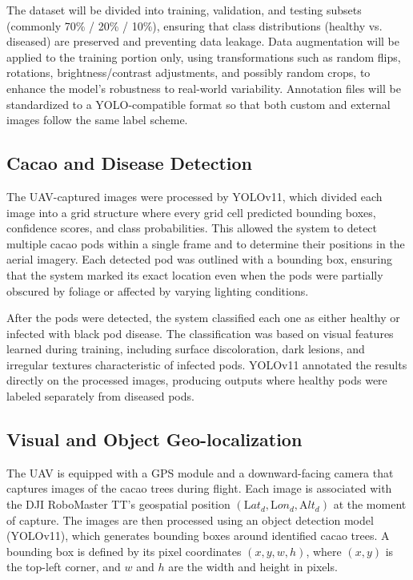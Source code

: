 The dataset will be divided into training, validation, and testing subsets (commonly 70\% / 20\% / 10\%), ensuring that class distributions (healthy vs. diseased) are preserved and preventing data leakage. Data augmentation will be applied to the training portion only, using transformations such as random flips, rotations, brightness/contrast adjustments, and possibly random crops, to enhance the model’s robustness to real-world variability. Annotation files will be standardized to a YOLO-compatible format so that both custom and external images follow the same label scheme.

\subsection{Cacao and Disease Detection}

The UAV-captured images were processed by YOLOv11, which divided each image into a grid structure where every grid cell predicted bounding boxes, confidence scores, and class probabilities. This allowed the system to detect multiple cacao pods within a single frame and to determine their positions in the aerial imagery. Each detected pod was outlined with a bounding box, ensuring that the system marked its exact location even when the pods were partially obscured by foliage or affected by varying lighting conditions.

After the pods were detected, the system classified each one as either healthy or infected with black pod disease. The classification was based on visual features learned during training, including surface discoloration, dark lesions, and irregular textures characteristic of infected pods. YOLOv11 annotated the results directly on the processed images, producing outputs where healthy pods were labeled separately from diseased pods.

\subsection{Visual and Object Geo-localization}

The UAV is equipped with a GPS module and a downward-facing camera that captures images of the cacao trees during flight. Each image is associated with the DJI RoboMaster TT’s geospatial position $(\text{L}at_d, \text{L}on_d, \text{A}lt_d)$ at the moment of capture. The images are then processed using an object detection model (YOLOv11), which generates bounding boxes around identified cacao trees. A bounding box is defined by its pixel coordinates $(x, y, w, h)$, where $(x, y)$ is the top-left corner, and $w$ and $h$ are the width and height in pixels.

